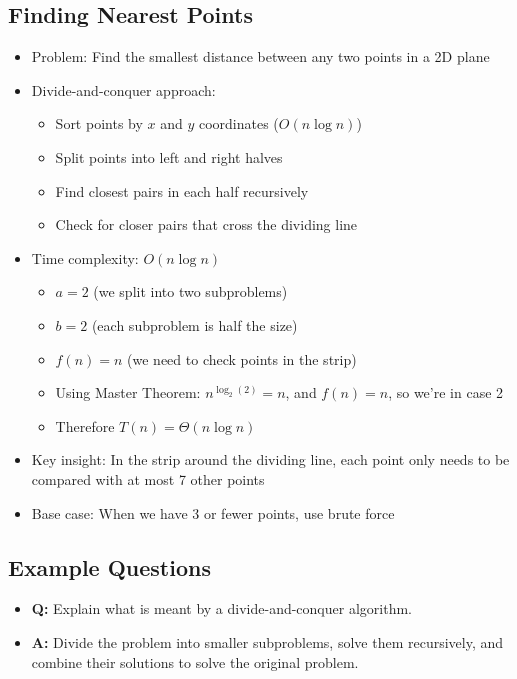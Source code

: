 \documentclass[11pt,a4paper]{article}
\begin{document}
\begin{multicols}{2}
\subsection{Finding Nearest Points}
\begin{itemize}
    \item Problem: Find the smallest distance between any two points in a 2D plane
    \item Divide-and-conquer approach:
    \begin{itemize}
        \item Sort points by $x$ and $y$ coordinates ($O(n \log n)$)
        \item Split points into left and right halves
        \item Find closest pairs in each half recursively
        \item Check for closer pairs that cross the dividing line
    \end{itemize}
    \item Time complexity: $O(n \log n)$
    \begin{itemize}
        \item $a = 2$ (we split into two subproblems)
        \item $b = 2$ (each subproblem is half the size)
        \item $f(n) = n$ (we need to check points in the strip)
        \item Using Master Theorem: $n^{\log_2(2)} = n$, and $f(n) = n$, so we're in case 2
        \item Therefore $T(n) = \Theta(n \log n)$
    \end{itemize}
    \item Key insight: In the strip around the dividing line, each point only needs to be compared with at most 7 other points
    \item Base case: When we have 3 or fewer points, use brute force
\end{itemize}

\subsection{Example Questions}
\begin{itemize}
    \item \textbf{Q:} Explain what is meant by a divide-and-conquer algorithm.
    \item \textbf{A:} Divide the problem into smaller subproblems, solve them recursively, and combine their solutions to solve the original problem.


\end{itemize}
\end{multicols}
\end{document}
